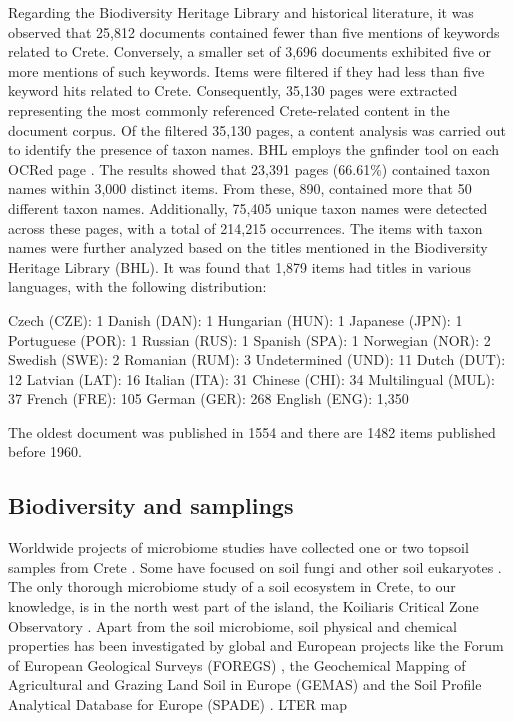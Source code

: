 Regarding the Biodiversity Heritage Library and historical literature, it was
observed that 25,812 documents contained fewer than five mentions of keywords related to Crete.
Conversely, a smaller set of 3,696 documents exhibited five or more mentions of such keywords.
Items were filtered if they had less than five keyword hits related to Crete.
Consequently, 35,130 pages were extracted representing the most commonly referenced Crete-related content in the document corpus.
Of the filtered 35,130 pages, a content analysis was carried out to identify the presence of taxon names.
BHL employs the gnfinder tool on each OCRed page \parencite{mozzherin_gnamesgnfinder_2022}.
The results showed that 23,391 pages (66.61\%) contained taxon names within 3,000 distinct items.
From these, 890, contained more that 50 different taxon names.
Additionally, 75,405 unique taxon names were detected across these pages, with a total of 214,215 occurrences.
The items with taxon names were further analyzed based on the titles mentioned
in the Biodiversity Heritage Library (BHL). It was found that 1,879 items had titles in various languages, with the following distribution:

Czech (CZE): 1
Danish (DAN): 1
Hungarian (HUN): 1
Japanese (JPN): 1
Portuguese (POR): 1
Russian (RUS): 1
Spanish (SPA): 1
Norwegian (NOR): 2
Swedish (SWE): 2
Romanian (RUM): 3
Undetermined (UND): 11
Dutch (DUT): 12
Latvian (LAT): 16
Italian (ITA): 31
Chinese (CHI): 34
Multilingual (MUL): 37
French (FRE): 105
German (GER): 268
English (ENG): 1,350

The oldest document was published in 1554 and there are 1482 items published before 1960.

\subsection{Biodiversity and samplings}

Worldwide projects of microbiome studies have collected one or two topsoil
samples from Crete \parencite{Vasar2022, Labouyrie2023, Bahram2018, Orgiazzi2018}.
Some have focused on soil fungi \parencite{Mikryukov2023, Davison2021, Tedersoo2021}
and other soil eukaryotes \parencite{Aslani2022}.
The only thorough microbiome study of a soil ecosystem in Crete, to our knowledge,
is in the north west part of the island, the Koiliaris Critical Zone Observatory \parencite{tsiknia2014}.
Apart from the soil microbiome, soil physical and chemical properties has been
investigated by global and European projects like the Forum of European Geological Surveys
(FOREGS) \parencite{nerc19017}, the Geochemical Mapping of Agricultural and Grazing Land
Soil in Europe (GEMAS) \parencite{REIMANN2018302} and the Soil Profile Analytical
Database for Europe (SPADE) \parencite{Hiederer2006}.
LTER map

